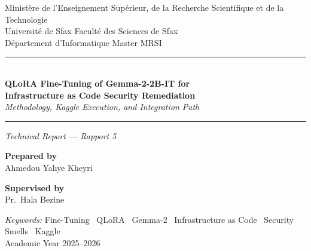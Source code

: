 \documentclass[12pt, a4paper]{report}
\begin{document}

\begin{titlepage}
  \centering

  \vspace*{2.5cm}
  {\small Ministère de l'Enseignement Supérieur, de la Recherche Scientifique
   et de la Technologie}\\[4pt]
  {\small Université de Sfax \enspace\textbar\enspace Faculté des Sciences de Sfax}\\[4pt]
  {\small Département d'Informatique \enspace\textbar\enspace Master MRSI}

  \vspace{2.5cm}

  \noindent\rule{\linewidth}{0.6pt}\\[0.8cm]

  {\Large\bfseries\color{titleblue}
    QLoRA Fine-Tuning of Gemma-2-2B-IT for\\[6pt]
    Infrastructure as Code Security Remediation
  }\\[0.4cm]

  {\normalsize\itshape Methodology, Kaggle Execution, and Integration Path}\\[0.6cm]

  \noindent\rule{\linewidth}{0.6pt}

  \vspace{0.6cm}
  {\normalsize\itshape Technical Report --- Rapport 5}

  \vspace{3cm}
  \begin{minipage}[t]{0.45\textwidth}
    \raggedright
    {\small\bfseries Prepared by}\\[4pt]
    {\normalsize Ahmedou Yahye Kheyri}\\[2pt]
  \end{minipage}
  \hfill
  \begin{minipage}[t]{0.45\textwidth}
    \raggedleft
    {\small\bfseries Supervised by}\\[4pt]
    {\normalsize Pr.\ Hala Bezine}\\[2pt]
  \end{minipage}

  \vfill
  {\small\textit{Keywords:}\enspace
   Fine-Tuning \textbullet\
   QLoRA \textbullet\
   Gemma-2 \textbullet\
   Infrastructure as Code \textbullet\
   Security Smells \textbullet\
   Kaggle}\\[1.2cm]

  {\small Academic Year 2025--2026}
  \vspace{1cm}

\end{titlepage}
\end{document}
